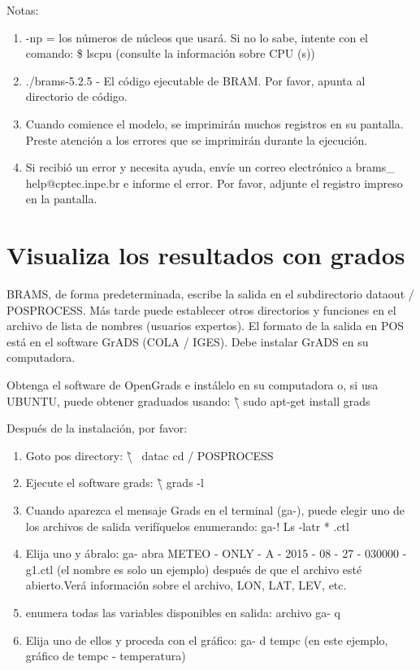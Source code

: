 \documentclass[12pt,letterpaper]{article}
\begin{document}
Notas:
\begin{enumerate}[1.]
\item -np = los números de núcleos que usará. 
Si no lo sabe, intente con el comando: \$ lscpu (consulte la información sobre CPU (s))
\item ./brams-5.2.5 - El código ejecutable de BRAM. Por favor, apunta al directorio de código.
\item Cuando comience el modelo, se imprimirán muchos registros en su pantalla. Preste atención a los errores que se imprimirán durante la ejecución.
\item Si recibió un error y necesita ayuda, envíe un correo electrónico a brams\_ help@cptec.inpe.br e informe el error. Por favor, adjunte el registro impreso en la pantalla.

\end{enumerate}
\section{Visualiza los resultados con grados}
BRAMS, de forma predeterminada, escribe la salida en el subdirectorio dataout / POSPROCESS. Más tarde puede establecer otros directorios y funciones en el archivo de lista de nombres (usuarios expertos). El formato de la salida en POS está en el software GrADS (COLA / IGES). Debe instalar GrADS en su computadora.

Obtenga el software de OpenGrads e instálelo en su computadora o, si usa UBUNTU, puede obtener graduados usando: \~   \textbackslash{} sudo apt-get install grads

Después de la instalación, por favor:

\begin{enumerate}
\item Goto pos directory: \~ \textbackslash{} \ datac cd / POSPROCESS
\item Ejecute el software grads: \~ \textbackslash{} grads -l
\item Cuando aparezca el mensaje Grads en el terminal (ga-), puede elegir uno de los archivos de salida verifíquelos enumerando: ga-! Ls -latr * .ctl
\item Elija uno y ábralo: ga- abra METEO - ONLY -    A - 2015 - 08 - 27 - 030000 - g1.ctl (el nombre es solo un ejemplo) después de que el archivo esté abierto.Verá información sobre el archivo, LON, LAT, LEV, etc.
\item enumera todas las variables disponibles en salida: archivo ga- q
\item Elija uno de ellos y proceda con el gráfico: ga- d tempc (en este ejemplo, gráfico de tempc - temperatura)
\end{enumerate}
\end{document}
